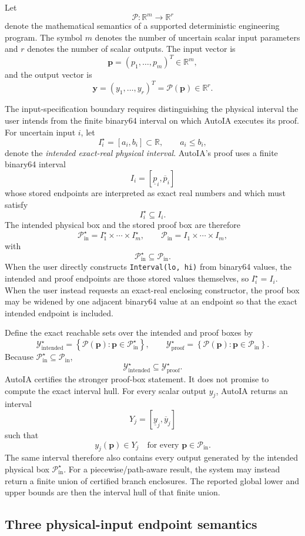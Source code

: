 \documentclass[11pt]{article}
\newcommand{\R}{\mathbb{R}}
\newcommand{\Pin}{\mathcal{P}_{\mathrm{in}}}
\newcommand{\Yset}{\mathcal{Y}}
\newcommand{\pv}{\mathbf{p}}
\newcommand{\yv}{\mathbf{y}}
\begin{document}
Let
\[
  \mathcal{P}:\R^m\rightarrow\R^r
\]
denote the mathematical semantics of a supported deterministic engineering
program.  The symbol \(m\) denotes the number of uncertain scalar input
parameters and \(r\) denotes the number of scalar outputs.  The input vector is
\[
  \pv=(p_1,\ldots,p_m)^T\in\R^m,
\]
and the output vector is
\[
  \yv=(y_1,\ldots,y_r)^T=\mathcal{P}(\pv)\in\R^r.
\]

The input-specification boundary requires distinguishing the physical interval the
user intends from the finite binary64 interval on which AutoIA executes its proof.
For uncertain input \(i\), let
\[
  I_i^\star=[a_i,b_i]\subset\R,
  \qquad a_i\le b_i,
\]
denote the \emph{intended exact-real physical interval}.  AutoIA's proof uses a
finite binary64 interval
\[
  I_i=[\underline p_i,\overline p_i]
\]
whose stored endpoints are interpreted as exact real numbers and which must
satisfy
\[
  \boxed{I_i^\star\subseteq I_i.}
\]
The intended physical box and the stored proof box are therefore
\[
  \Pin^\star=I_1^\star\times\cdots\times I_m^\star,
  \qquad
  \Pin=I_1\times\cdots\times I_m,
\]
with
\[
  \Pin^\star\subseteq\Pin.
\]
When the user directly constructs \texttt{Interval(lo, hi)} from binary64
values, the intended and proof endpoints are those stored values themselves, so
\(I_i^\star=I_i\).  When the user instead requests an exact-real enclosing
constructor, the proof box may be widened by one adjacent binary64 value at an
endpoint so that the exact intended endpoint is included.

Define the exact reachable sets over the intended and proof boxes by
\[
  \Yset_{\mathrm{intended}}^\star
  =\left\{\mathcal{P}(\pv):\pv\in\Pin^\star\right\},
  \qquad
  \Yset_{\mathrm{proof}}^\star
  =\left\{\mathcal{P}(\pv):\pv\in\Pin\right\}.
\]
Because \(\Pin^\star\subseteq\Pin\),
\[
  \Yset_{\mathrm{intended}}^\star
  \subseteq
  \Yset_{\mathrm{proof}}^\star.
\]
AutoIA certifies the stronger proof-box statement.  It does not promise to
compute the exact interval hull.  For every scalar output \(y_j\), AutoIA returns
an interval
\[
  Y_j=[\underline y_j,\overline y_j]
\]
such that
\[
  \boxed{
  y_j(\pv)\in Y_j
  \quad\text{for every }\pv\in\Pin.
  }
\]
The same interval therefore also contains every output generated by the intended
physical box \(\Pin^\star\).  For a piecewise/path-aware result, the system may
instead return a finite union of certified branch enclosures.  The reported
global lower and upper bounds are then the interval hull of that finite union.

\subsection{Three physical-input endpoint semantics}
\end{document}
